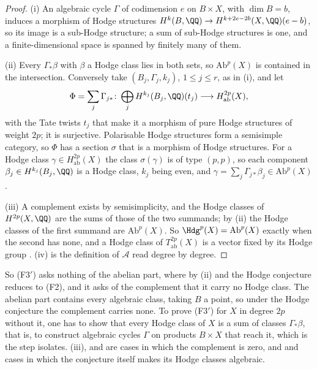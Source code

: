 \begin{proof}
(i) An algebraic cycle $\Gamma$ of codimension $e$ on $B\times X$, with
$\dim B=b$, induces a morphism of Hodge structures
$H^{k}(B,\QQ)\to H^{k+2e-2b}(X,\QQ)(e-b)$, so its image is a sub-Hodge
structure; a sum of sub-Hodge structures is one, and a finite-dimensional
space is spanned by finitely many of them.

(ii) Every $\Gamma_{*}\beta$ with $\beta$ a Hodge class lies in both sets, so
$\mathrm{Ab}^{p}(X)$ is contained in the intersection. Conversely take
$(B_{j},\Gamma_{j},k_{j})$, $1\le j\le r$, as in (i), and let
\[
  \Phi=\sum_{j}\Gamma_{j*}\colon
  \bigoplus_{j}H^{k_{j}}(B_{j},\QQ)(t_{j})\longrightarrow
  H^{2p}_{\mathrm{ab}}(X),
\]
with the Tate twists $t_{j}$ that make it a morphism of pure Hodge structures
of weight $2p$; it is surjective. Polarisable Hodge structures form a
semisimple category, so $\Phi$ has a section $\sigma$ that is a morphism of
Hodge structures. For a Hodge class $\gamma\in H^{2p}_{\mathrm{ab}}(X)$ the
class $\sigma(\gamma)$ is of type $(p,p)$, so each component
$\beta_{j}\in H^{k_{j}}(B_{j},\QQ)$ is a Hodge class, $k_{j}$ being even, and
$\gamma=\sum_{j}\Gamma_{j*}\beta_{j}\in\mathrm{Ab}^{p}(X)$.

(iii) A complement exists by semisimplicity, and the Hodge classes of
$H^{2p}(X,\QQ)$ are the sums of those of the two summands; by (ii) the
Hodge classes of the first summand are $\mathrm{Ab}^{p}(X)$. So
$\Hdg^{p}(X)=\mathrm{Ab}^{p}(X)$ exactly when the second has none, and a
Hodge class of $T^{2p}_{\mathrm{ab}}(X)$ is a vector fixed by its Hodge group
\cite[\S3]{Del82}. (iv) is the definition of $\mathcal{A}$ read degree by
degree.
\end{proof}

So \textup{(F3$'$)} asks nothing of the abelian part, where by (ii) and
 the Hodge conjecture reduces to (F2), and it asks of the
complement that it carry no Hodge class. The abelian part contains every
algebraic class, taking $B$ a point, so under the Hodge conjecture the
complement carries none. To prove \textup{(F3$'$)} for $X$ in degree $2p$
without it, one has to show that every Hodge class of $X$ is a sum of
classes $\Gamma_{*}\beta$, that is, to construct algebraic cycles $\Gamma$
on products $B\times X$ that reach it, which is the step
 isolates.
(iii),  and 
are cases in which the complement is zero, and  and
 cases in which the conjecture itself makes its Hodge
classes algebraic.

